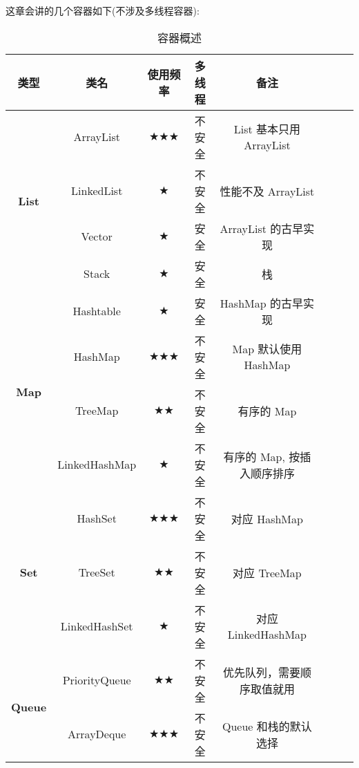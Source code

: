 这章会讲的几个容器如下(不涉及多线程容器):

\begin{table}[H]
    \centering
    \small
    \caption{容器概述}
    \label{table:容器概述}
    \setlength{\tabcolsep}{4mm}
    \begin{tabular}{c|c|c|c|cccc}
        \toprule
        \textbf{类型} & \textbf{类名} & \textbf{使用频率} & \textbf{多线程} & \textbf{备注} \\
        \midrule
        \multirow{4}{*}{\textbf{List}} & ArrayList & $\bigstar\bigstar\bigstar$ & 不安全 & List 基本只用 ArrayList \\
        & LinkedList & $\bigstar$ & 不安全 & 性能不及 ArrayList \\
        & Vector & $\bigstar$ & 安全 & ArrayList 的古早实现 \\
        & Stack & $\bigstar$ & 安全 & 栈 \\
        \midrule
        \multirow{4}{*}{\textbf{Map}} & Hashtable & $\bigstar$ & 安全 & HashMap 的古早实现 \\
        & HashMap & $\bigstar\bigstar\bigstar$ & 不安全 & Map 默认使用 HashMap \\
        & TreeMap & $\bigstar\bigstar$ & 不安全 & 有序的 Map \\
        & LinkedHashMap & $\bigstar$ & 不安全 & 有序的 Map, 按插入顺序排序 \\
        \midrule
        \multirow{3}{*}{\textbf{Set}} & HashSet & $\bigstar\bigstar\bigstar$ & 不安全 & 对应 HashMap \\
        & TreeSet & $\bigstar\bigstar$ & 不安全 & 对应 TreeMap \\
        & LinkedHashSet & $\bigstar$ & 不安全 & 对应 LinkedHashMap \\
        \midrule
        \multirow{2}{*}{\textbf{Queue}} & PriorityQueue & $\bigstar\bigstar$ & 不安全 & 优先队列，需要顺序取值就用 \\
        & ArrayDeque & $\bigstar\bigstar\bigstar$ & 不安全 & Queue 和栈的默认选择 \\
        \bottomrule
    \end{tabular}
\end{table}

\newpage